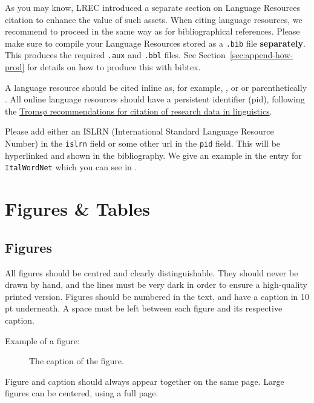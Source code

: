 \documentclass[10pt, a4paper]{article}
\begin{document}
As you may know, LREC introduced a separate section on Language
Resources citation to enhance the value of such assets. When citing
language resources, we recommend to proceed in the same way as for
bibliographical references. Please make sure to compile your Language
Resources stored as a \texttt{.bib} file \textbf{separately}. This
produces the required \texttt{.aux} and \texttt{.bbl} files.  See
Section~\ref{sec:append-how-prod} for details on how to produce this
with bibtex.

A language resource should be cited inline as, for example,
, or  or
parenthetically .  All online
language resources should have a persistent identifier (pid), following the \href{https://doi.org/10.15497/RDA00040}{Tromsø recommendations for citation of research data in linguistics}.

Please add either an ISLRN (International Standard Language Resource
Number) in the \texttt{islrn} field or some other url in the
\texttt{pid} field.  This will be hyperlinked and shown in the
bibliography.  We give an example in the entry for \texttt{ItalWordNet} which you can see in .
  



  
\section{Figures \& Tables}

\subsection{Figures}

All figures should be centred and clearly distinguishable. They should never be drawn by hand, and the lines must be very dark in order to ensure a high-quality printed version. Figures should be numbered in the text, and have a caption in 10 pt underneath. A space must be left between each figure and its respective caption. 

Example of a figure:

\begin{figure}[!ht]
\begin{center}
\caption{The caption of the figure.}
\label{fig.1}
\end{center}
\end{figure}

Figure and caption should always appear together on the same page. Large figures can be centered, using a full page.
\end{document}
